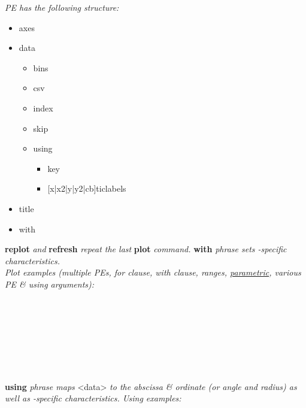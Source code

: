 \textit{PE has the following structure:}
\begin{itemize}[label=|-]
\item axes
\item data
    \begin{itemize}[label=|-]
	\item bins
	\item csv
	\item index
	\item skip
	\item using
	    \begin{itemize}[label=|-]
		\item key
		\item {[x|x2|y|y2|cb]}ticlabels
	    \end{itemize}
    \end{itemize}
\item title
\item with
\end{itemize}


\textbf{replot} \textit{ and }\textbf{refresh}\textit{ repeat the last }\textbf{plot}\textit{ command. }\textbf{with}\textit{ phrase sets -specific characteristics.} \\
\textit{Plot examples (multiple PEs, for clause, with clause, ranges, \href{http://www.gnuplot.info/demo/param.html}{parametric}, various PE \& using arguments):}\\
\\
\\
\\
\\
\\
\\
\\
 
\textbf{using}\textit{ phrase maps }<data>\textit{ to the abscissa \& ordinate (or angle and radius) as well as -specific characteristics. Using examples:}\\
\\
\\
\\
\\



